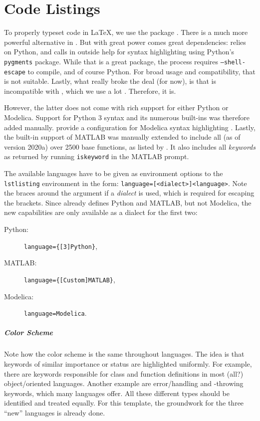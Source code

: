 \chapter{Code Listings}

To properly typeset code in \LaTeX{}, we use the package .
There is a much more powerful alternative in .
But with great power comes great dependencies:  relies on
Python, and calls in outside help for syntax highlighting using Python's
\texttt{pygments} package.
While that is a great package, the process requires \texttt{--shell-escape} to
compile, and of course Python.
For broad usage and compatibility, that is not suitable.
Lastly, what really broke the deal (for now), is that  is
incompatible with , which we use a lot \autocite{egreg_minted_2017}.
Therefore,  it is.

However, the latter does not come with rich support for either Python or
Modelica.
Support for Python 3 syntax and its numerous built-ins was therefore added manually.
 provide a configuration
for Modelica syntax highlighting \autocite{winkler_modelica-toolslistings-modelica_2020}.
Lastly, the built-in support of MATLAB was manually extended to include all
(as of version 2020a) over 2500 base functions, as listed by \citeauthor{mathworks_matlab_2020}
\autocite{mathworks_matlab_2020}.
It also includes all \emph{keywords} as returned by running \texttt{iskeyword} in
the MATLAB prompt.

The available languages have to be given as environment options to the \texttt{lstlisting}
environment in the form: \texttt{language={[<dialect>]<language>}}.
Note the braces around the argument if a \emph{dialect} is used, which is required for
escaping the brackets.
Since  already defines Python and MATLAB, but not Modelica, the
new capabilities are only available as a dialect for the first two:
\begin{description}
    \item[Python:] \texttt{language=\{[3]Python\}},
    \item[MATLAB:] \texttt{language=\{[Custom]MATLAB\}},
    \item[Modelica:] \texttt{language=Modelica}.
\end{description}

\paragraph{Color Scheme}
Note how the color scheme is the same throughout languages.
The idea is that keywords of similar importance or status are highlighted uniformly.
For example, there are keywords responsible for class and function definitions in most
(all?) object\-/oriented languages.
Another example are error\-/handling and -throwing keywords, which many languages
offer.
All these different types should be identified and treated equally.
For this template, the groundwork for the three \enquote{new} languages is already done.

